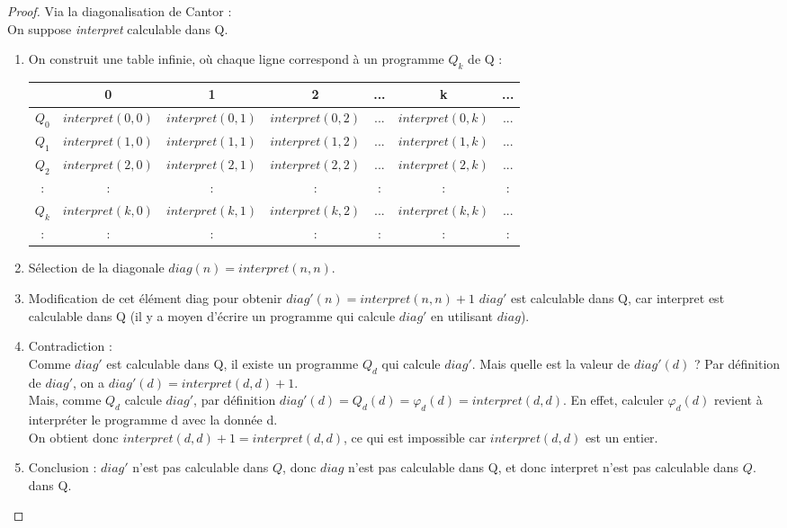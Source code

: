 \begin{proof} Via la diagonalisation de Cantor : \\
On suppose \textit{interpret} calculable dans Q.
\begin{enumerate}
	\item On construit une table infinie, où chaque ligne correspond à un programme $Q_k$ de Q : \\
		\begin{tabular}{|c||c|c|c|c|c|c|}
			\hline
			& 0 & 1 & 2 & ... & k & ... \\
			\hline
			$Q_0$ & $interpret(0,0)$ & $interpret(0,1)$ & $interpret(0,2)$ & ... & $interpret(0,k)$ & ... \\
			$Q_1$ & $interpret(1,0)$ & $interpret(1,1)$ & $interpret(1,2)$ & ... & $interpret(1,k)$ & ... \\
			$Q_2$ & $interpret(2,0)$ & $interpret(2,1)$ & $interpret(2,2)$ & ... & $interpret(2,k)$ & ... \\
			: & : &:& : & : & : &:\\
			$Q_k$ & $interpret(k,0)$ & $interpret(k,1)$ & $interpret(k,2)$ & ... & $interpret(k,k)$ & ... \\
			: & : &:& : & : & : &:\\
			\hline
		\end{tabular}
	\item Sélection de la diagonale
		$diag(n) = interpret(n,n)$.
	\item Modification de cet élément diag pour obtenir
		$diag'(n) = interpret(n,n)+1$
		$diag'$ est calculable dans Q, car interpret est calculable dans Q (il y a moyen
		d'écrire un programme qui calcule $diag'$ en utilisant $diag$).

	\item Contradiction :\\
	       	Comme $diag'$ est calculable dans Q, il existe un programme $Q_d$ qui calcule $diag'$.  
		Mais quelle est la valeur de $diag'(d)$ ?
		Par définition de $diag'$, on a $diag'(d) = interpret(d,d)+1$. \\
		Mais, comme $Q_d$ calcule $diag'$, par définition $diag'(d) = Q_d(d) = \varphi_d(d) = interpret(d,d)$.
		En effet, calculer $\varphi_d(d)$ revient à interpréter le programme
		d avec la donnée d. \\
		On obtient donc $interpret(d,d)+1 = interpret(d,d)$, ce qui est impossible car $interpret(d,d)$ est un entier. 
	\item Conclusion : $diag'$ n'est pas calculable dans $Q$, donc $diag$
	n'est pas calculable dans Q, et donc interpret n'est pas calculable dans $Q$.
dans Q.
\end{enumerate}
\end{proof}

